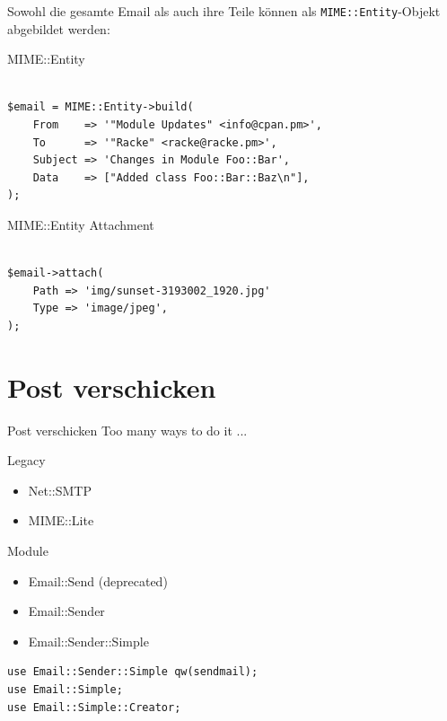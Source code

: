 Sowohl die gesamte Email als auch ihre Teile können als
\verb|MIME::Entity|-Objekt abgebildet werden:

\begin{frame}[fragile]{MIME::Entity}
  \begin{lstlisting}

$email = MIME::Entity->build(
    From    => '"Module Updates" <info@cpan.pm>',
    To      => '"Racke" <racke@racke.pm>',
    Subject => 'Changes in Module Foo::Bar',
    Data    => ["Added class Foo::Bar::Baz\n"],
);
  \end{lstlisting}
\end{frame}

\begin{frame}[fragile]{MIME::Entity Attachment}
  \begin{lstlisting}

$email->attach(
    Path => 'img/sunset-3193002_1920.jpg'
    Type => 'image/jpeg',
);

  \end{lstlisting}
\end{frame}

\section{Post verschicken}

\begin{frame}{Post verschicken}
  Too many ways to do it ...
\end{frame}

\begin{frame}{Legacy}
  \begin{itemize}
    \item Net::SMTP
    \item MIME::Lite
  \end{itemize}
\end{frame}

\begin{frame}{Module}
  \begin{itemize}
  \item Email::Send (deprecated)
  \item Email::Sender
  \item Email::Sender::Simple
  \end{itemize}
\end{frame}

\begin{lstlisting}
use Email::Sender::Simple qw(sendmail);
use Email::Simple;
use Email::Simple::Creator;
\end{lstlisting}

